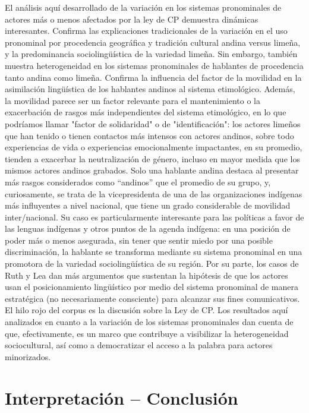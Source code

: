 \documentclass[output=paper]{../langscibook}
\begin{document}
El análisis aquí desarrollado de la variación en los sistemas pronominales de actores más o menos afectados por la ley de CP demuestra dinámicas interesantes. Confirma las explicaciones tradicionales de la variación en el uso pronominal por procedencia geográfica y tradición cultural andina versus limeña, y la predominancia sociolingüística de la variedad limeña. Sin embargo, también muestra heterogeneidad en los sistemas pronominales de hablantes de procedencia tanto andina como limeña. Confirma la influencia del factor de la movilidad en la asimilación lingüística de los hablantes andinos al sistema etimológico. Además, la movilidad parece ser un factor relevante para el mantenimiento o la exacerbación de rasgos más independientes del sistema etimológico, en lo que podríamos llamar "factor de solidaridad" o de "identificación": los actores limeños que han tenido o tienen contactos más intensos con actores andinos, sobre todo experiencias de vida o experiencias emocionalmente impactantes, en su promedio, tienden a exacerbar la neutralización de género, incluso en mayor medida que los mismos actores andinos grabados. Solo una hablante andina destaca al presentar más rasgos considerados como “andinos” que el promedio de su grupo, y, curiosamente, se trata de la vicepresidenta de una de las organizaciones indígenas más influyentes a nivel nacional, que tiene un grado considerable de movilidad inter/nacional. Su caso es particularmente interesante para las políticas a favor de las lenguas indígenas y otros puntos de la agenda indígena: en una posición de poder más o menos asegurada, sin tener que sentir miedo por una posible discriminación, la hablante se transforma mediante su sistema pronominal en una promotora de la variedad sociolingüística de su región. Por su parte, los casos de Ruth y Lea dan más argumentos que sustentan la hipótesis de que los actores usan el posicionamiento lingüístico por medio del sistema pronominal de manera estratégica (no necesariamente consciente) para alcanzar sus fines comunicativos. El hilo rojo del corpus es la discusión sobre la Ley de CP. Los resultados aquí analizados en cuanto a la variación de los sistemas pronominales dan cuenta de que, efectivamente, es un marco que contribuye a visibilizar la heterogeneidad sociocultural, así como a democratizar el acceso a la palabra para actores minorizados. 

\section{Interpretación – Conclusión}\label{sec:mick:9}
\end{document}
